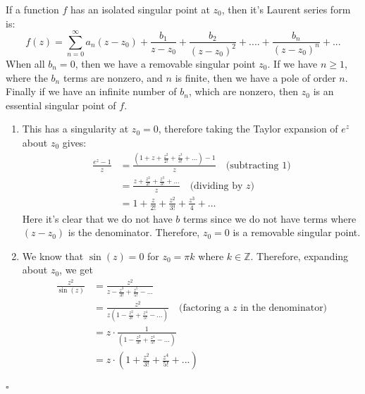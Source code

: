 \documentclass[11pt]{article}
\newcommand{\Z}{\mathbb{Z}}
\newenvironment{proof}{\noindent{\bf Proof.}}{\hfill $\square$\medskip}
\begin{document}
\begin{proof}
    If a function $f$ has an isolated singular point at $z_{0}$, then it's Laurent series form is:
    $$f(z)=\sum_{n=0}^{\infty}a_{n}(z-z_{0})+\frac{b_{1}}{z-z_{0}}+\frac{b_{2}}{(z-z_{0})^{2}}+....+\frac{b_{n}}{(z-z_{0})^{n}}+...$$
    When all $b_{n}=0$, then we have a removable singular point $z_{0}$. If we have $n\geq1$, where the $b_{n}$ terms are nonzero, and $n$ is finite, then we have a pole of order $n$. Finally if we have an infinite number of $b_{n}$, which are nonzero, then $z_{0}$ is an essential singular point of $f$.
    \begin{enumerate}[label=\textbf{(\alph*)}]
        \item This has a singularity at $z_{0}=0$, therefore taking the Taylor expansion of $e^{z}$ about $z_{0}$ gives:
              \begin{equation}
                  \begin{split}
                      \frac{e^{z}-1}{z}&=\frac{\left(1+z+\frac{z^{2}}{2!}+\frac{z^{3}}{3!}+...\right)-1}{z}\quad\text{(subtracting $1$)}
                      \\
                      &=\frac{z+\frac{z^{2}}{2!}+\frac{z^{3}}{3!}+...}{z}\quad\text{(dividing by $z$)}
                      \\
                      &=1+\frac{z}{2!}+\frac{z^{2}}{3!}+\frac{z^{3}}{4}+...
                  \end{split}
              \end{equation}
              Here it's clear that we do not have $b$ terms since we do not have terms where $(z-z_{0})$ is the denominator. Therefore, $z_{0}=0$ is a removable singular point.
        \item We know that $\sin(z)=0$ for $z_{0}=\pi k$ where $k\in\Z$. Therefore, expanding about $z_{0}$, we get
              \begin{equation}
                  \begin{split}
                      \frac{z^{2}}{\sin(z)}&=\frac{z^{2}}{z-\frac{z^{3}}{3!}+\frac{z^{5}}{5!}-...}\\
                      &=\frac{z^{2}}{z\left(1-\frac{z^{2}}{3!}+\frac{z^{4}}{5!}-...\right)}\quad\text{(factoring a $z$ in the denominator)}\\
                      &=z\cdot \frac{1}{\left(1-\frac{z^{2}}{3!}+\frac{z^{4}}{5!}-...\right)}\\
                      &=z\cdot (1+\frac{z^{2}}{3!}+\frac{z^{4}}{5!}+...)\\

\end{split}
\end{equation}
\end{enumerate}
\end{proof}
\end{document}

